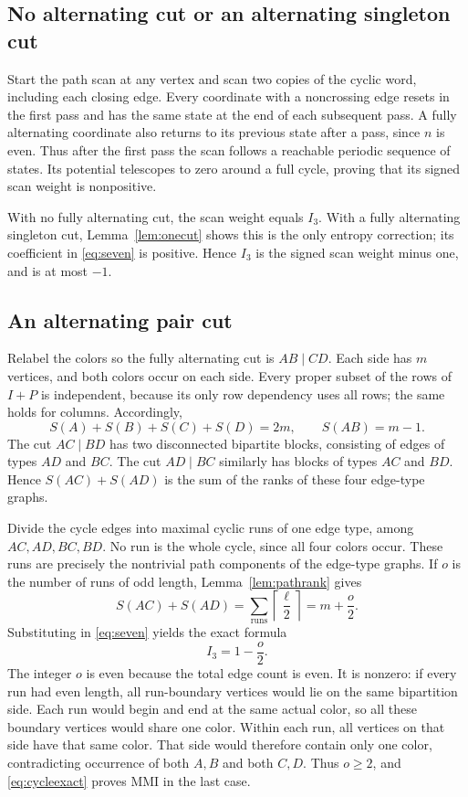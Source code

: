 \documentclass[11pt,letterpaper]{article}
\newcommand{\Ithree}{I_3}
\begin{document}
\subsection{No alternating cut or an alternating singleton cut}
Start the path scan at any vertex and scan two copies of the cyclic word, including each closing edge. Every coordinate with a noncrossing edge resets in the first pass and has the same state at the end of each subsequent pass. A fully alternating coordinate also returns to its previous state after a pass, since $n$ is even. Thus after the first pass the scan follows a reachable periodic sequence of states. Its potential telescopes to zero around a full cycle, proving that its signed scan weight is nonpositive.

With no fully alternating cut, the scan weight equals $\Ithree$. With a fully alternating singleton cut, Lemma~\ref{lem:onecut} shows this is the only entropy correction; its coefficient in \eqref{eq:seven} is positive. Hence $\Ithree$ is the signed scan weight minus one, and is at most $-1$.

\subsection{An alternating pair cut}
Relabel the colors so the fully alternating cut is $AB\mid CD$. Each side has $m$ vertices, and both colors occur on each side. Every proper subset of the rows of $I+P$ is independent, because its only row dependency uses all rows; the same holds for columns. Accordingly,
\begin{equation}\label{eq:singletons}
 S(A)+S(B)+S(C)+S(D)=2m,\qquad S(AB)=m-1.
\end{equation}
The cut $AC\mid BD$ has two disconnected bipartite blocks, consisting of edges of types $AD$ and $BC$. The cut $AD\mid BC$ similarly has blocks of types $AC$ and $BD$. Hence $S(AC)+S(AD)$ is the sum of the ranks of these four edge-type graphs.

Divide the cycle edges into maximal cyclic runs of one edge type, among $AC,AD,BC,BD$. No run is the whole cycle, since all four colors occur. These runs are precisely the nontrivial path components of the edge-type graphs. If $o$ is the number of runs of odd length, Lemma~\ref{lem:pathrank} gives
\[
 S(AC)+S(AD)=\sum_{\text{runs}}\left\lceil\frac{\ell}{2}\right\rceil=m+\frac{o}{2}.
\]
Substituting in \eqref{eq:seven} yields the exact formula
\begin{equation}\label{eq:cycleexact}
 \boxed{\Ithree=1-\frac{o}{2}.}
\end{equation}
The integer $o$ is even because the total edge count is even. It is nonzero: if every run had even length, all run-boundary vertices would lie on the same bipartition side. Each run would begin and end at the same actual color, so all these boundary vertices would share one color. Within each run, all vertices on that side have that same color. That side would therefore contain only one color, contradicting occurrence of both $A,B$ and both $C,D$. Thus $o\geq2$, and \eqref{eq:cycleexact} proves MMI in the last case.
\end{document}
